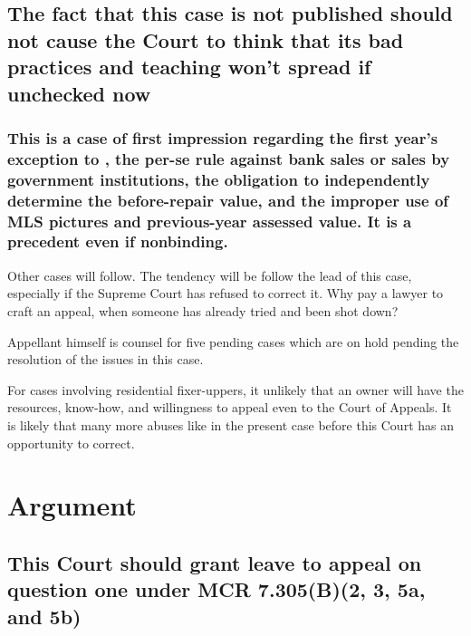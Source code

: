 \documentclass[12pt,\documentclassflag]{michiganCourtOfAppealsBrief}
\begin{document}





\subsection{The fact that this case is not published should not cause the Court to think that its bad practices and teaching won't spread if unchecked now}

\subsubsection{This is a case of first impression regarding the first year's exception to \mathieuGast, the per-se rule against bank sales or sales by government institutions, the obligation to independently determine the before-repair value, and the improper use of MLS pictures and previous-year assessed value. It is a precedent even if nonbinding.}

Other cases will follow. The tendency will be follow the lead of this case, especially if the Supreme Court has refused to correct it. Why pay a lawyer to craft an appeal, when someone has already tried and been shot down?

Appellant himself is counsel for five pending cases which are on hold pending the resolution of the issues in this case.

For cases involving residential fixer-uppers, it unlikely that an owner will have the resources, know-how, and willingness to appeal even to the Court of Appeals. It is likely that many more abuses like in the present case before this Court has an opportunity to correct.


\section{Argument}



\subsection{This Court should grant leave to appeal on question one under MCR 7.305(B)(2, 3, 5a, and 5b)}
\end{document}
